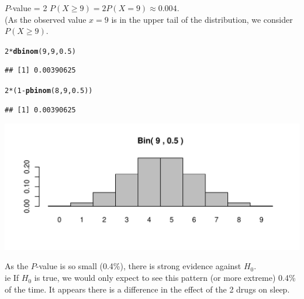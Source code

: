 \documentclass[t,xcolor=pdftex,dvipsnames,table]{beamer}\usepackage[]{graphicx}\usepackage[]{color}
\makeatletter
\def\maxwidth{ %
  \ifdim\Gin@nat@width>\linewidth
    \linewidth
  \else
    \Gin@nat@width
  \fi
}
\newcommand{\hlnum}[1]{\textcolor[rgb]{0.686,0.059,0.569}{#1}}%
\newcommand{\hlopt}[1]{\textcolor[rgb]{0,0,0}{#1}}%
\newcommand{\hlstd}[1]{\textcolor[rgb]{0.345,0.345,0.345}{#1}}%
\newcommand{\hlkwd}[1]{\textcolor[rgb]{0.737,0.353,0.396}{\textbf{#1}}}%
\newenvironment{kframe}{%
 \def\at@end@of@kframe{}%
 \ifinner\ifhmode%
  \def\at@end@of@kframe{\end{minipage}}%
  \begin{minipage}{\columnwidth}%
 \fi\fi%
 \def\FrameCommand##1{\hskip\@totalleftmargin \hskip-\fboxsep
 \colorbox{shadecolor}{##1}\hskip-\fboxsep
     \hskip-\linewidth \hskip-\@totalleftmargin \hskip\columnwidth}%
 \MakeFramed {\advance\hsize-\width
   \@totalleftmargin\z@ \linewidth\hsize
   \@setminipage}}%
 {\par\unskip\endMakeFramed%
 \at@end@of@kframe}
\newenvironment{knitrout}{}{} %
\makeatother
\begin{document}
\begin{frame}[fragile]{}

 $P$-value = 2 $P( X \geq 9) = 2 P( X = 9) \approx 0.004$. \\
(As the observed value $x=9$ is in the upper tail of the distribution, we consider $P(X \geq 9)$.

\begin{knitrout}
\color{fgcolor}\begin{kframe}
\begin{alltt}
\hlnum{2}\hlopt{*} \hlkwd{dbinom}\hlstd{(}\hlnum{9}\hlstd{,}\hlnum{9}\hlstd{,}\hlnum{0.5}\hlstd{)}
\end{alltt}
\begin{verbatim}
## [1] 0.00390625
\end{verbatim}
\begin{alltt}
\hlnum{2}\hlopt{*} \hlstd{(}\hlnum{1}\hlopt{-}\hlkwd{pbinom}\hlstd{(}\hlnum{8}\hlstd{,}\hlnum{9}\hlstd{,}\hlnum{0.5}\hlstd{))}
\end{alltt}
\begin{verbatim}
## [1] 0.00390625
\end{verbatim}
\end{kframe}
\end{knitrout}

\begin{knitrout}
\color{fgcolor}
\includegraphics[width=\maxwidth]{figure/unnamed-chunk-133-1} 

\end{knitrout}
\end{frame}


\begin{frame}{}

 As the $P$-value is so small (0.4\%), there is strong evidence against $H_{0}$. \\
ie If $H_{0}$ is true, we would only expect to see this pattern (or more extreme) 0.4\% of the time. It appears there is a difference in the effect of the 2 drugs on sleep.
\end{frame}
\end{document}
